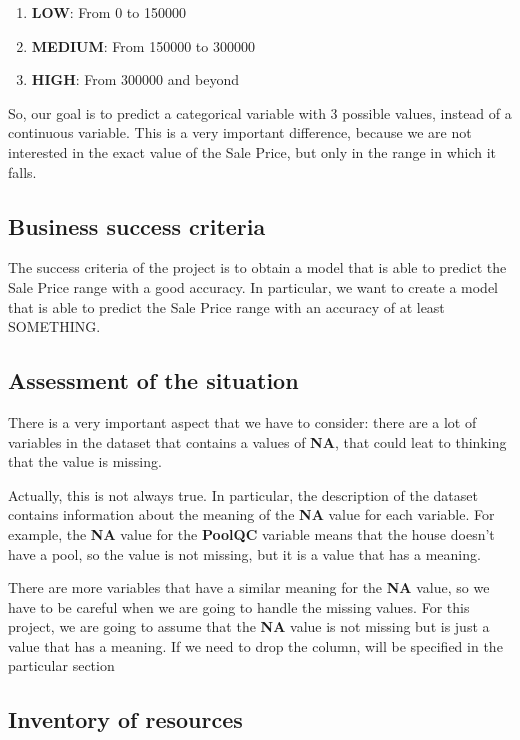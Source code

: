 \begin{enumerate}
    \item \textbf{LOW}: From 0 to 150000 
    \item \textbf{MEDIUM}: From 150000 to 300000 
    \item \textbf{HIGH}: From 300000 and beyond 
\end{enumerate}

So, our goal is to predict a categorical variable with 3 possible values, instead of a continuous variable. 
This is a very important difference, because we are not interested in the exact value of the Sale Price, but only in the range in which it falls.

\subsection{Business success criteria}
\label{subsec:business_success_criteria}
The success criteria of the project is to obtain a model that is able to predict the Sale Price range with a good accuracy. In particular, we want to create a model that is able to predict the Sale Price range with an accuracy of at least SOMETHING.

\subsection{Assessment of the situation}
\label{subsec:assessment_of_the_situation}

There is a very important aspect that we have to consider: there are a lot of variables in the dataset that contains a values of \textbf{NA}, that could leat to thinking that the value is missing.

Actually, this is not always true. In particular, the description of the dataset contains information about the meaning of the \textbf{NA} value for each variable. For example, the \textbf{NA} value for the \textbf{PoolQC} variable means that the house doesn't have a pool, so the value is not missing, but it is a value that has a meaning.

There are more variables that have a similar meaning for the \textbf{NA} value, so we have to be careful when we are going to handle the missing values. For this project, we are going to assume that the \textbf{NA} value is not missing but is just a value that has a meaning. If we need to drop the column, will be specified in the particular section

\subsection{Inventory of resources}
\label{subsec:inventory_of_resources}

